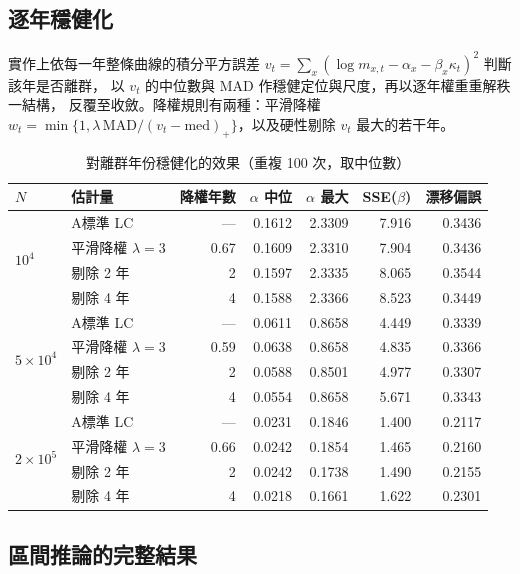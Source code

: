 \documentclass[UTF8, fontset=macnew, a4paper, 12pt]{ctexart}
\begin{document}
\subsection{逐年穩健化}

實作上依每一年整條曲線的積分平方誤差
$v_t=\sum_x(\log m_{x,t}-\alpha_x-\beta_x\kappa_t)^2$ 判斷該年是否離群，
以 $v_t$ 的中位數與 MAD 作穩健定位與尺度，再以逐年權重重解秩一結構，
反覆至收斂。降權規則有兩種：平滑降權
$w_t=\min\{1,\lambda\,\mathrm{MAD}/(v_t-\mathrm{med})_+\}$，以及硬性剔除
$v_t$ 最大的若干年。

\begin{table}[H]
\centering
\caption{對離群年份穩健化的效果（重複 100 次，取中位數）}
\small
\begin{tabular}{llrrrrr}
\toprule
$N$ & 估計量 & 降權年數 & $\alpha$ 中位 & $\alpha$ 最大 & SSE($\beta$) & 漂移偏誤\\
\midrule
\multirow{4}{*}{$10^4$}
 & A\quad 標準 LC        & ---  & 0.1612 & 2.3309 & 7.916 & 0.3436\\
 & 平滑降權 $\lambda=3$  & 0.67 & 0.1609 & 2.3310 & 7.904 & 0.3436\\
 & 剔除 2 年             & 2    & 0.1597 & 2.3335 & 8.065 & 0.3544\\
 & 剔除 4 年             & 4    & 0.1588 & 2.3366 & 8.523 & 0.3449\\
\midrule
\multirow{4}{*}{$5\times10^4$}
 & A\quad 標準 LC        & ---  & 0.0611 & 0.8658 & 4.449 & 0.3339\\
 & 平滑降權 $\lambda=3$  & 0.59 & 0.0638 & 0.8658 & 4.835 & 0.3366\\
 & 剔除 2 年             & 2    & 0.0588 & 0.8501 & 4.977 & 0.3307\\
 & 剔除 4 年             & 4    & 0.0554 & 0.8658 & 5.671 & 0.3343\\
\midrule
\multirow{4}{*}{$2\times10^5$}
 & A\quad 標準 LC        & ---  & 0.0231 & 0.1846 & 1.400 & 0.2117\\
 & 平滑降權 $\lambda=3$  & 0.66 & 0.0242 & 0.1854 & 1.465 & 0.2160\\
 & 剔除 2 年             & 2    & 0.0242 & 0.1738 & 1.490 & 0.2155\\
 & 剔除 4 年             & 4    & 0.0218 & 0.1661 & 1.622 & 0.2301\\
\bottomrule
\end{tabular}
\label{tab:hu}
\end{table}

\subsection{區間推論的完整結果}
\end{document}
